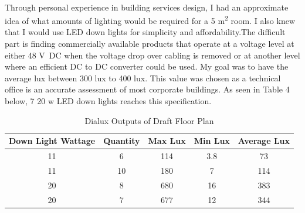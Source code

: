 \paragraph{}
Through personal experience in building services design, I had an approximate idea of what amounts of lighting would be required for a 5 \si{m^2} room. I also knew that I would use LED down lights for simplicity and affordability.The difficult part is finding commercially available products that operate at a voltage level at either 48 \si{V DC} when the voltage drop over cabling is removed or at another level where an efficient DC to DC converter could be used. My goal was to have the average lux between 300 \si{lux} to 400 \si{lux}. This value was chosen as a technical office is an accurate assessment of most corporate buildings. As seen in Table 4 below, 7 20 \si{w} LED down lights reaches this specification.     

\begin{table}[!ht]
\centering
\renewcommand{\arraystretch}{2}
\begin{tabular}{|c|c|c|c|c|}
\hline
\multicolumn{1}{|l|}{\textbf{Down Light Wattage}} & \multicolumn{1}{l|}{\textbf{Quantity}} & \multicolumn{1}{l|}{\textbf{Max Lux}} & \multicolumn{1}{l|}{\textbf{Min Lux}} & \multicolumn{1}{l|}{\textbf{Average Lux}} \\ \hline
11 & 6 & 114 & 3.8 & 73 \\ \hline
11 & 10 & 180 & 7 & 114 \\ \hline
20 & 8 & 680 & 16 & 383 \\ \hline
20 & 7 & 677 & 12 & 344 \\ \hline
\end{tabular}
\caption{Dialux Outputs of Draft Floor Plan}
\label{draftFloorPlanDialuxOutputs}
\end{table} 